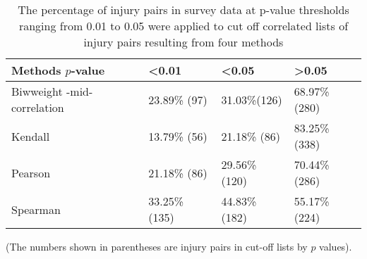 \begin{table}[]
\centering
\caption{The percentage of injury pairs in survey data at p-value thresholds ranging from 0.01 to 0.05 were applied to cut off correlated lists of injury pairs resulting from four methods}
\label{table_injurypairs_percent}
\begin{tabular}{llll}
\hline
Methods $p$-value            & \textless 0.01 & \textless 0.05 & \textgreater 0.05 \\
\hline
Biwweight -mid-correlation & 23.89\% (97)             & 31.03\%(126)            & 68.97\% (280)               \\
Kendall                    & 13.79\% (56)             & 21.18\% (86)             & 83.25\% (338)               \\
Pearson                    & 21.18\% (86)             & 29.56\% (120)            & 70.44\% (286)               \\
Spearman                   & 33.25\% (135)            & 44.83\% (182)            & 55.17\% (224)              \\
\hline
\end{tabular}
\end{table}

(The numbers shown in parentheses are injury pairs in cut-off lists by $p$ values).